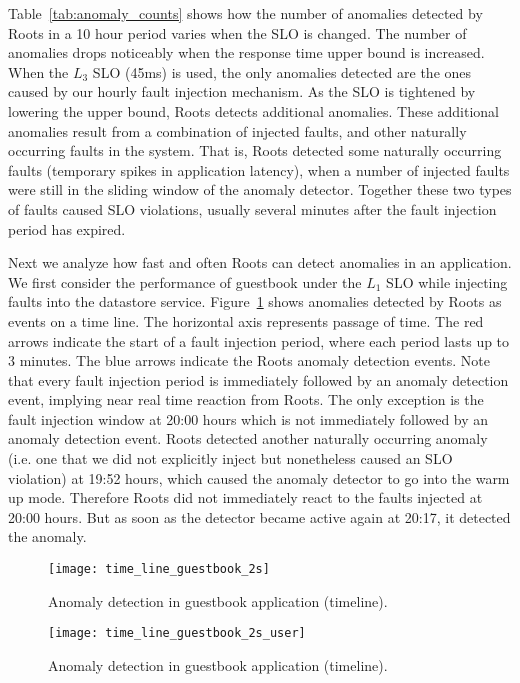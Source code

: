 Table~\ref{tab:anomaly_counts} shows how the number of anomalies detected by 
Roots in a 10 hour period varies when the SLO is changed. The number of anomalies
drops noticeably when the response time upper bound is increased. When the $L_3$
SLO (45ms) is used, the only anomalies detected are the ones
caused by our hourly fault injection mechanism. As the SLO is tightened by lowering the upper bound,
Roots detects additional anomalies. These additional anomalies
result from a combination of injected faults, and other naturally occurring faults
in the system. That is, Roots detected some naturally occurring
faults (temporary spikes in application latency), when a number of injected faults
were still in the sliding window of the anomaly detector. Together these two types of
faults caused SLO violations, usually several minutes after the fault injection period
has expired.

Next we analyze how fast and often Roots can detect anomalies in an application. We
first consider the performance of guestbook under the $L_1$ SLO while 
injecting faults into the datastore service. Figure~\ref{fig:time_line_guestbook_2s} shows
anomalies detected by Roots as events on a time line. The horizontal axis represents 
passage of time. The red arrows indicate the start of a fault injection period, where each
period lasts up to 3 minutes.
The blue arrows indicate the Roots anomaly detection events.
Note that every fault injection period is immediately followed by an anomaly
detection event, implying near real time reaction from Roots. The only exception is the fault
injection window at 20:00 hours which is not immediately followed by an anomaly 
detection event. Roots detected another naturally occurring anomaly
(i.e. one
that we did not explicitly inject but nonetheless caused an SLO violation) at 19:52 hours,
which caused the anomaly detector to go into the warm up mode. Therefore Roots
did not immediately react to the faults injected at 20:00 hours. But as soon as the detector became
active again at 20:17, it detected the anomaly.

\begin{figure}
\centering
\texttt{[image: time\_line\_guestbook\_2s]}
\caption{Anomaly detection in guestbook application (timeline).}
\label{fig:time_line_guestbook_2s}
\end{figure}

\begin{figure}
\centering
\texttt{[image: time\_line\_guestbook\_2s\_user]}
\caption{Anomaly detection in guestbook application (timeline).}
\label{fig:time_line_guestbook_2s_user}
\end{figure}

